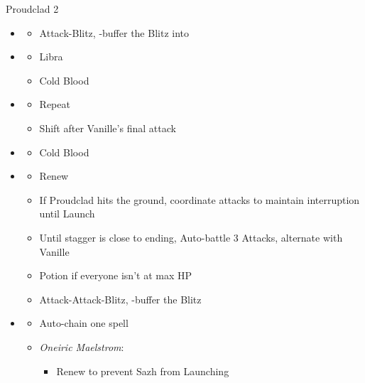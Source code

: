 \begin{battle}{Proudclad 2}
  \begin{multicols}{2}
    \begin{itemize}
      \item \second
            \begin{itemize}
              \item Attack-Blitz, \rav-buffer the Blitz into
            \end{itemize}
      \item \sixth
            \begin{itemize}
              \item Libra
              \item Cold Blood
            \end{itemize}
      \item \fifth
            \begin{itemize}
              \item Repeat
              \item Shift after Vanille's final attack
            \end{itemize}
      \item \first
            \begin{itemize}
              \item Cold Blood
            \end{itemize}
      \item \second
            \begin{itemize}
              \item Renew
              \item If Proudclad hits the ground, coordinate attacks to maintain interruption until Launch
              \item Until stagger is close to ending, Auto-battle 3 Attacks, alternate with Vanille
              \item Potion if everyone isn't at max HP
              \item Attack-Attack-Blitz, \rav-buffer the Blitz
            \end{itemize}
      \item \third
            \begin{itemize}
              \item Auto-chain one spell
              \item \textit{Oneiric Maelstrom}:
                    \begin{itemize}
                      \item Renew to prevent Sazh from Launching

\end{itemize}
\end{itemize}
\end{itemize}
\end{multicols}
\end{battle}
